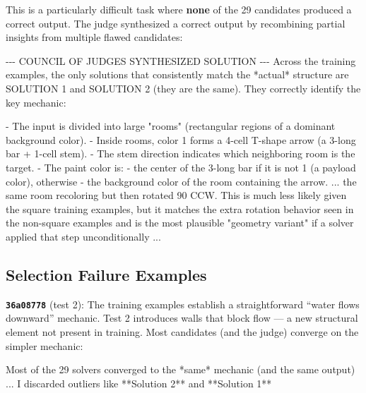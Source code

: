 \documentclass[10pt]{article}
\newenvironment{Shaded}{}{}
\newcommand{\NormalTok}[1]{#1}
\begin{document}
This is a particularly difficult task where \textbf{none} of the 29
candidates produced a correct output. The judge synthesized a correct
output by recombining partial insights from multiple flawed candidates:

\begin{Shaded}
\begin{Highlighting}[]
\NormalTok{{-}{-}{-} COUNCIL OF JUDGES SYNTHESIZED SOLUTION {-}{-}{-}}
\NormalTok{Across the training examples, the only solutions that}
\NormalTok{consistently match the *actual* structure are SOLUTION 1}
\NormalTok{and SOLUTION 2 (they are the same). They correctly}
\NormalTok{identify the key mechanic:}

\NormalTok{{-} The input is divided into large "rooms" (rectangular}
\NormalTok{  regions of a dominant background color).}
\NormalTok{{-} Inside rooms, color 1 forms a 4{-}cell T{-}shape arrow}
\NormalTok{  (a 3{-}long bar + 1{-}cell stem).}
\NormalTok{{-} The stem direction indicates which neighboring room}
\NormalTok{  is the target.}
\NormalTok{{-} The paint color is:}
\NormalTok{  {-} the center of the 3{-}long bar if it is not 1}
\NormalTok{    (a payload color), otherwise}
\NormalTok{  {-} the background color of the room containing}
\NormalTok{    the arrow.}
\NormalTok{...}
\NormalTok{the same room recoloring but then rotated 90 CCW.}
\NormalTok{This is much less likely given the square training}
\NormalTok{examples, but it matches the extra rotation behavior}
\NormalTok{seen in the non{-}square examples and is the most}
\NormalTok{plausible "geometry variant" if a solver applied}
\NormalTok{that step unconditionally}
\NormalTok{...}
\end{Highlighting}
\end{Shaded}

\hypertarget{selection-failure-examples}{%
\subsection{Selection Failure
Examples}\label{selection-failure-examples}}

\textbf{\texttt{36a08778}} (test 2): The training examples establish a
straightforward ``water flows downward'' mechanic. Test 2 introduces
walls that block flow --- a new structural element not present in
training. Most candidates (and the judge) converge on the simpler
mechanic:

\begin{Shaded}
\begin{Highlighting}[]
\NormalTok{Most of the 29 solvers converged to the *same* mechanic (and the same output)}
\NormalTok{...}
\NormalTok{I discarded outliers like **Solution 2** and **Solution 1**}
\end{Highlighting}
\end{Shaded}
\end{document}
